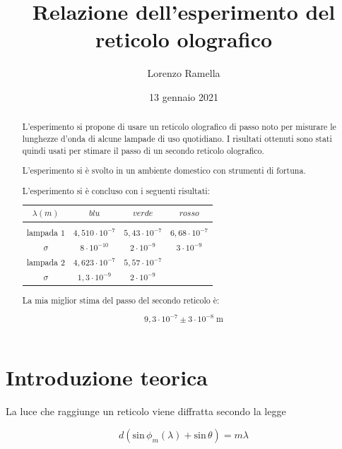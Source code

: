 \documentclass{article}
\title{Relazione dell'esperimento del reticolo olografico}
\author{Lorenzo Ramella}
\date{13 gennaio 2021}
\begin{document}
\maketitle

\begin{abstract}
L’esperimento si propone di usare un reticolo olografico di passo noto per misurare le lunghezze d'onda di alcune lampade di uso quotidiano. I risultati ottenuti sono stati quindi usati per stimare il passo di un secondo reticolo olografico.

L'esperimento si è svolto in un ambiente domestico con strumenti di fortuna.

L'esperimento si è concluso con i seguenti risultati:

\vspace{4mm}

\begin{center}
\begin{tabular}{ || c | c | c | c || }
  \hline
  $\lambda (m)$ & $blu$ & $verde$ & $rosso$ \\
  \hline \hline &&& \\ [-0.9ex]
  lampada $1$ & $4,510 \cdot 10^{-7}$ & $5,43 \cdot 10^{-7}$ & $6,68 \cdot 10^{-7}$ \\
  $\sigma$ & $8 \cdot 10^{-10}$ & $2 \cdot 10^{-9}$ & $3 \cdot 10^{-9}$ \\
  lampada $2$ & $4,623 \cdot 10^{-7}$ & $5,57 \cdot 10^{-7}$ & \\
  $\sigma$ & $1,3 \cdot 10^{-9}$ & $2 \cdot 10^{-9}$ & \\
  \hline
\end{tabular}
\end{center}

\vspace{4mm}

La mia miglior stima del passo del secondo reticolo è:

\[9,3 \cdot 10^{-7} \pm 3 \cdot 10^{-8} \; \textrm{m}\]

\end{abstract}
\tableofcontents

\clearpage

\section{Introduzione teorica}

La luce che raggiunge un reticolo viene diffratta secondo la legge 

\begin{equation}
d(\textrm{sin} \, \phi_m (\lambda) + \textrm{sin} \, \theta) = m\lambda
\end{equation}
\end{document}
